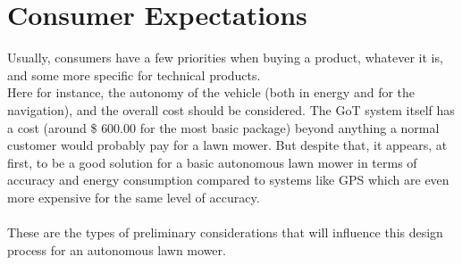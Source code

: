 \section{Consumer Expectations}
Usually, consumers have a few priorities when buying a product, whatever it is, and some more specific for technical products.\\
Here for instance, the autonomy of the vehicle (both in energy and for the navigation), and the overall cost should be considered. The GoT system itself has a cost (around \$ $600.00$ for the most basic package) beyond anything a normal customer would probably pay for a lawn mower. But despite that, it appears, at first, to be a good solution for a basic autonomous lawn mower in terms of accuracy and energy consumption compared to systems like GPS which are even more expensive for the same level of accuracy. \\\\
These are the types of preliminary considerations that will influence this design process for an autonomous lawn mower.